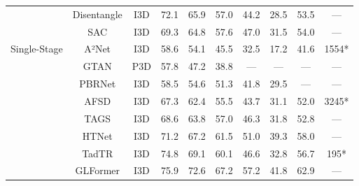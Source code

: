 \documentclass[10pt,twocolumn,letterpaper]{article}
\begin{document}
\begin{table*}[]
{\begin{tabular}{cccccccccc}
                              & Disentangle \cite{zhu2022learning}                                           & I3D \cite{carreira2017quo} & 72.1          & 65.9          & 57.0          & 44.2          & 28.5          & 53.5 & --- \\
                              & SAC \cite{yang2022structured}                                           & I3D \cite{carreira2017quo}      & 69.3          & 64.8          & 57.6          & 47.0          & 31.5          & 54.0 & --- \\
                              \cline{2-10}
\multirow{7}{*}{Single-Stage} & A²Net \cite{yang2020revisiting}                                         & I3D \cite{carreira2017quo}      & 58.6          & 54.1          & 45.5          & 32.5          & 17.2          & 41.6 & 1554* \\
                              & GTAN \cite{long2019gaussian}                                            & P3D \cite{qiu2017learning}      & 57.8          & 47.2          & 38.8          & ---           & ---           & ---  & --- \\
                              & PBRNet \cite{liu2020progressive}                                        & I3D \cite{carreira2017quo}      & 58.5          & 54.6          & 51.3          & 41.8          & 29.5          & ---  & --- \\
                              & AFSD \cite{lin2021learning}                                             & I3D \cite{carreira2017quo}      & 67.3          & 62.4          & 55.5          & 43.7          & 31.1          & 52.0 & 3245* \\
                              & TAGS \cite{nag2022proposal}                                                 & I3D \cite{carreira2017quo}  & 68.6          & 63.8          & 57.0          &  46.3         & 31.8          &  52.8 & ---\\
                              & HTNet \cite{kang2022htnet}                                                 & I3D \cite{carreira2017quo}   & 71.2          & 67.2          & 61.5          &  51.0         & 39.3          &  58.0 & ---\\
                              & TadTR \cite{liu2022end}                                                 & I3D \cite{carreira2017quo}      & 74.8          & 69.1          & 60.1          & 46.6          & 32.8          & 56.7  & 195* \\
                              & GLFormer \cite{he2022glformer}                                                 & I3D \cite{carreira2017quo}      & 75.9 & 72.6 & 67.2 & 57.2 & 41.8 & 62.9 & ---\\

\end{tabular}}
\end{table*}
\end{document}
